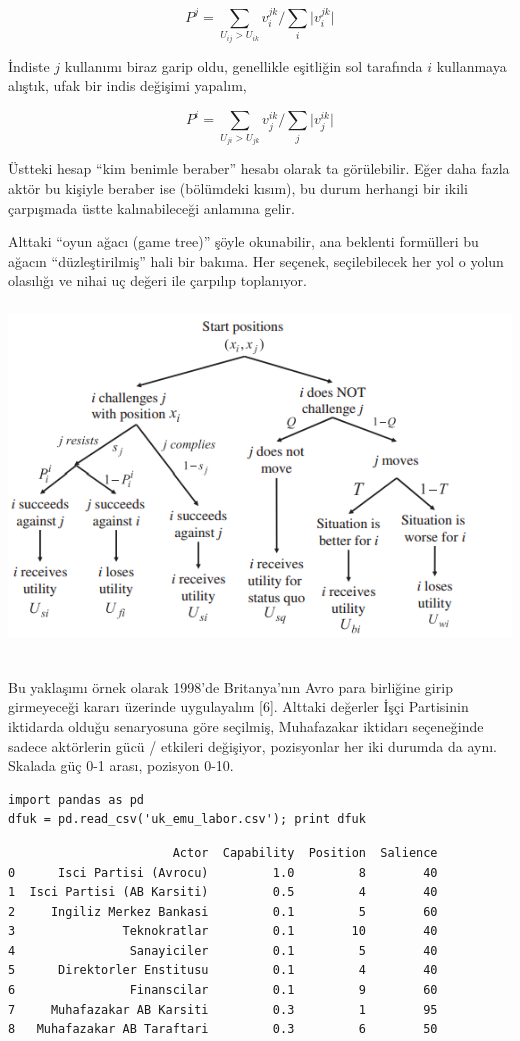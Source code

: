 \documentclass[12pt,fleqn]{article}\usepackage{../../common}
\begin{document}
$$
P^j = 
\sum_{ U_{ij} > U_{ik} } v_i^{jk} \bigg/ 
\sum_i \big| v_i^{jk} \big|
$$

İndiste $j$ kullanımı biraz garip oldu, genellikle eşitliğin sol tarafında
$i$ kullanmaya alıştık, ufak bir indis değişimi yapalım,

$$
P^i = 
\sum_{ U_{ji} > U_{jk} } v_j^{ik} \bigg/ 
\sum_j \big| v_j^{ik} \big|
$$

Üstteki hesap ``kim benimle beraber'' hesabı olarak ta görülebilir. Eğer daha
fazla aktör bu kişiyle beraber ise (bölümdeki kısım), bu durum herhangi bir
ikili çarpışmada üstte kalınabileceği anlamına gelir. 

Alttaki ``oyun ağacı (game tree)'' şöyle okunabilir, ana beklenti formülleri bu
ağacın ``düzleştirilmiş'' hali bir bakıma. Her seçenek, seçilebilecek her yol o
yolun olasılığı ve nihai uç değeri ile çarpılıp toplanıyor.

\includegraphics[height=9cm]{gametree.png}

\inputminted[fontsize=\footnotesize]{python}{bdm.py}

Bu yaklaşımı örnek olarak 1998'de Britanya'nın Avro para birliğine girip
girmeyeceği kararı üzerinde uygulayalım [6]. Alttaki değerler İşçi Partisinin
iktidarda olduğu senaryosuna göre seçilmiş, Muhafazakar iktidarı seçeneğinde
sadece aktörlerin gücü / etkileri değişiyor, pozisyonlar her iki durumda da
aynı. Skalada güç 0-1 arası, pozisyon 0-10.

\begin{verbatim}
import pandas as pd
dfuk = pd.read_csv('uk_emu_labor.csv'); print dfuk
\end{verbatim}

\begin{verbatim}
                       Actor  Capability  Position  Salience
0      Isci Partisi (Avrocu)         1.0         8        40
1  Isci Partisi (AB Karsiti)         0.5         4        40
2     Ingiliz Merkez Bankasi         0.1         5        60
3               Teknokratlar         0.1        10        40
4                Sanayiciler         0.1         5        40
5      Direktorler Enstitusu         0.1         4        40
6                Finanscilar         0.1         9        60
7     Muhafazakar AB Karsiti         0.3         1        95
8   Muhafazakar AB Taraftari         0.3         6        50
\end{verbatim}
\end{document}
